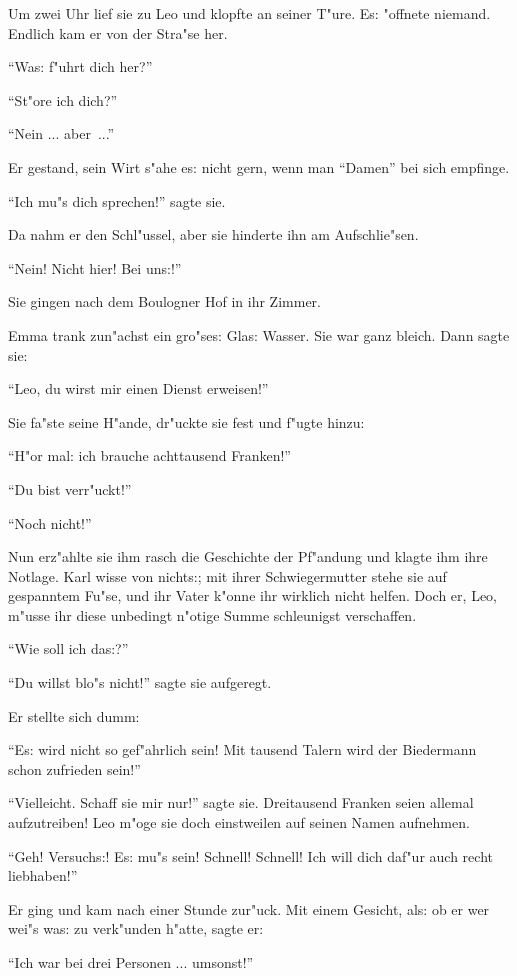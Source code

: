 \documentclass[oneside,12pt]{book}
\newcommand{\s}{s:}%
\begin{document}
Um zwei Uhr lief sie zu Leo und klopfte an seiner T"ure. E{\s}
"offnete niemand. Endlich kam er von der Stra"se her.

"`Wa{\s} f"uhrt dich her?"'

"`St"ore ich dich?"'

"`Nein ... aber~..."'

Er gestand, sein Wirt s"ahe e{\s} nicht gern, wenn man "`Damen"'
bei sich empfinge.

"`Ich mu"s dich sprechen!"' sagte sie.

Da nahm er den Schl"ussel, aber sie hinderte ihn am Aufschlie"sen.

"`Nein! Nicht hier! Bei un{\s}!"'

Sie gingen nach dem Boulogner Hof in ihr Zimmer.

Emma trank zun"achst ein gro"se{\s} Gla{\s} Wasser. Sie war ganz
bleich. Dann sagte sie:

"`Leo, du wirst mir einen Dienst erweisen!"'

Sie fa"ste seine H"ande, dr"uckte sie fest und f"ugte hinzu:

"`H"or mal: ich brauche achttausend Franken!"'

"`Du bist verr"uckt!"'

"`Noch nicht!"'

Nun erz"ahlte sie ihm rasch die Geschichte der Pf"andung und
klagte ihm ihre Notlage. Karl wisse von nicht{\s}; mit ihrer
Schwiegermutter stehe sie auf gespanntem Fu"se, und ihr Vater
k"onne ihr wirklich nicht helfen. Doch er, Leo, m"usse ihr diese
unbedingt n"otige Summe schleunigst verschaffen.

"`Wie soll ich da{\s}?"'

"`Du willst blo"s nicht!"' sagte sie aufgeregt.

Er stellte sich dumm:

"`E{\s} wird nicht so gef"ahrlich sein! Mit tausend Talern wird
der Biedermann schon zufrieden sein!"'

"`Vielleicht. Schaff sie mir nur!"' sagte sie. Dreitausend Franken
seien allemal aufzutreiben! Leo m"oge sie doch einstweilen auf
seinen Namen aufnehmen.

"`Geh! Versuch{\s}! E{\s} mu"s sein! Schnell! Schnell! Ich will
dich daf"ur auch recht liebhaben!"'

Er ging und kam nach einer Stunde zur"uck. Mit einem Gesicht,
al{\s} ob er wer wei"s wa{\s} zu verk"unden h"atte, sagte er:

"`Ich war bei drei Personen ... umsonst!"'
\end{document}
